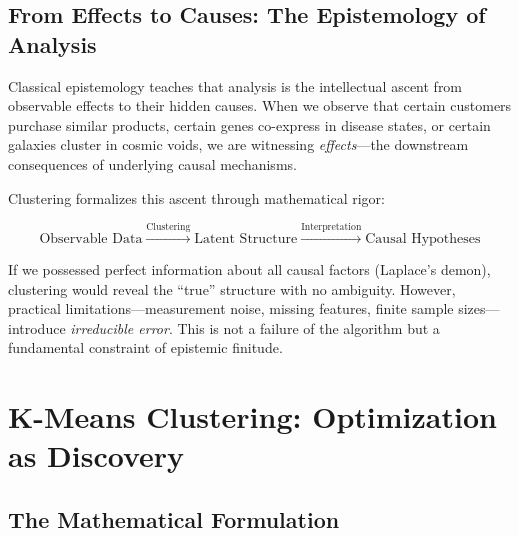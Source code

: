 \subsection{From Effects to Causes: The Epistemology of Analysis}

Classical epistemology teaches that analysis is the intellectual ascent from observable effects to their hidden causes. When we observe that certain customers purchase similar products, certain genes co-express in disease states, or certain galaxies cluster in cosmic voids, we are witnessing \textit{effects}---the downstream consequences of underlying causal mechanisms.

Clustering formalizes this ascent through mathematical rigor:

\begin{equation}
    \text{Observable Data} \xrightarrow{\text{Clustering}} \text{Latent Structure} \xrightarrow{\text{Interpretation}} \text{Causal Hypotheses}
\end{equation}

\begin{remark}
If we possessed perfect information about all causal factors (Laplace's demon), clustering would reveal the ``true'' structure with no ambiguity. However, practical limitations---measurement noise, missing features, finite sample sizes---introduce \textit{irreducible error}. This is not a failure of the algorithm but a fundamental constraint of epistemic finitude.
\end{remark}

\section{K-Means Clustering: Optimization as Discovery}

\subsection{The Mathematical Formulation}

